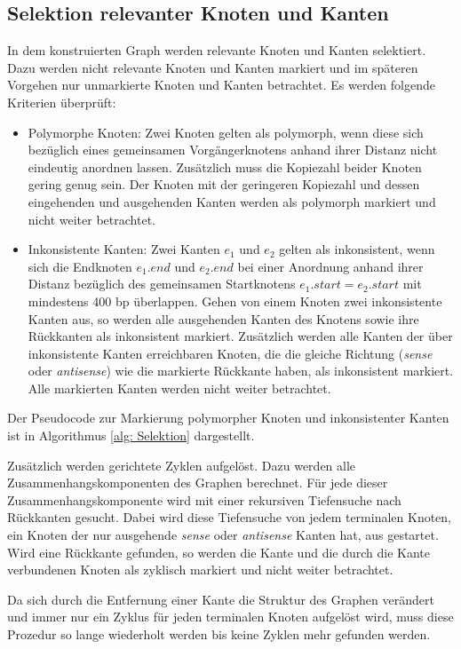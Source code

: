 \documentclass[a4paper,10pt,parskip]{scrartcl}
\begin{document}
\subsection{Selektion relevanter Knoten und Kanten}
In dem konstruierten Graph werden relevante Knoten und Kanten
selektiert. Dazu werden nicht relevante Knoten und Kanten markiert und
im späteren Vorgehen nur unmarkierte Knoten und Kanten betrachtet. Es
werden folgende Kriterien überprüft:
\begin{itemize}
\item Polymorphe Knoten: Zwei Knoten gelten als polymorph, wenn diese
  sich bezüglich eines gemeinsamen Vorgängerknotens anhand ihrer
  Distanz nicht eindeutig anordnen lassen. Zusätzlich muss die
  Kopiezahl beider Knoten gering genug sein. Der Knoten mit der
  geringeren Kopiezahl und dessen eingehenden und ausgehenden Kanten
  werden als polymorph markiert und nicht weiter betrachtet.
\item Inkonsistente Kanten: Zwei Kanten $e_1$ und $e_2$ gelten als
  inkonsistent, wenn sich die Endknoten $e_1.end$ und $e_2.end$ bei
  einer Anordnung anhand ihrer Distanz bezüglich des gemeinsamen
  Startknotens $e_1.start = e_2.start$ mit mindestens 400 bp
  überlappen. Gehen von einem Knoten zwei inkonsistente Kanten aus, so
  werden alle ausgehenden Kanten des Knotens sowie ihre Rückkanten als
  inkonsistent markiert. Zusätzlich werden alle Kanten der über
  inkonsistente Kanten erreichbaren Knoten, die die gleiche Richtung
  (\textit{sense} oder \textit{antisense}) wie die markierte Rückkante
  haben, als inkonsistent markiert. Alle markierten Kanten werden
  nicht weiter betrachtet.
\end{itemize}
Der Pseudocode zur Markierung polymorpher Knoten und inkonsistenter
Kanten ist in Algorithmus \ref{alg: Selektion} dargestellt.

Zusätzlich werden gerichtete Zyklen aufgelöst. Dazu werden alle
Zusammenhangskomponenten des Graphen berechnet. Für jede dieser
Zusammenhangskomponente wird mit einer rekursiven Tiefensuche nach
Rückkanten gesucht. Dabei wird diese Tiefensuche von jedem terminalen
Knoten, ein Knoten der nur ausgehende \textit{sense} oder
\textit{antisense} Kanten hat, aus gestartet. Wird eine Rückkante
gefunden, so werden die Kante und die durch die Kante verbundenen
Knoten als zyklisch markiert und nicht weiter betrachtet.

Da sich durch die Entfernung einer Kante die Struktur des Graphen
verändert und immer nur ein Zyklus für jeden terminalen Knoten
aufgelöst wird, muss diese Prozedur so lange wiederholt werden bis
keine Zyklen mehr gefunden werden.
\end{document}
